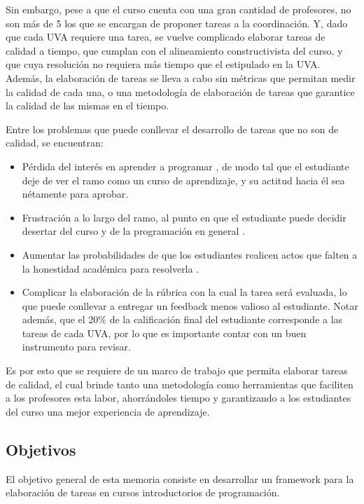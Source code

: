 \documentclass[letterpaper,12pt]{article}
\begin{document}
Sin embargo, pese a que el curso cuenta con una gran cantidad de profesores, no son más de 5 los que se encargan de proponer tareas a la coordinación. Y, dado que cada UVA requiere una tarea, se vuelve complicado elaborar tareas de calidad a tiempo, que cumplan con el alineamiento constructivista del curso, y que cuya resolución no requiera más tiempo que el estipulado en la UVA. Además, la elaboración de tareas se lleva a cabo sin métricas que permitan medir la calidad de cada una, o una metodología de elaboración de tareas que garantice la calidad de las mismas en el tiempo.

Entre los problemas que puede conllevar el desarrollo de tareas que no son de calidad, se encuentran:

\begin{itemize}
  \item Pérdida del interés en aprender a programar \cite{10.1145/1227504.1227466}, de modo tal que el estudiante deje de ver el ramo como un curso de aprendizaje, y su actitud hacia él sea nétamente para aprobar.
  \item Frustración a lo largo del ramo, al punto en que el estudiante puede decidir desertar del curso y de la programación en general \cite{10.1145/2526968.2526982}.
  \item Aumentar las probabilidades de que los estudiantes realicen actos que falten a la honestidad académica para resolverla \cite{10.1145/3013499.3013507}.
  \item Complicar la elaboración de la rúbrica con la cual la tarea será evaluada, lo que puede conllevar a entregar un feedback menos valioso al estudiante. Notar además, que el 20\% de la calificación final del estudiante corresponde a las tareas de cada UVA, por lo que es importante contar con un buen instrumento para revisar.
\end{itemize}

Es por esto que se requiere de un marco de trabajo que permita elaborar tareas de calidad, el cual brinde tanto una metodología como herramientas que faciliten a los profesores esta labor, ahorrándoles tiempo y garantizando a los estudiantes del curso una mejor experiencia de aprendizaje.

\subsection{Objetivos}

El objetivo general de esta memoria consiste en desarrollar un framework para la elaboración de tareas en cursos introductorios de programación.
\end{document}
